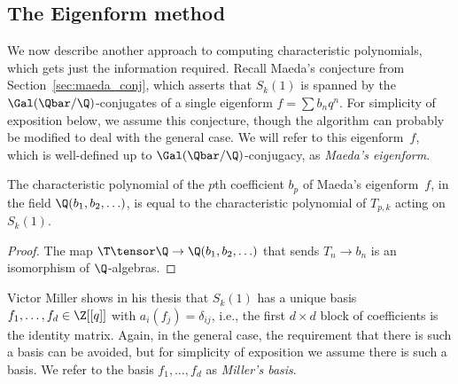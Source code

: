 \documentclass{report}
\begin{document}
\subsection{The Eigenform method}
We now describe another approach to computing characteristic
polynomials, which gets just the information required. Recall
Maeda's conjecture from Section~\ref{sec:maeda_conj}, which
asserts that $S_k(1)$ is spanned by the
$\Gal(\Qbar/\Q)$-conjugates of a single eigenform $f=\sum b_n
q^n$.  For simplicity of exposition below, we assume this
conjecture, though the algorithm can probably be modified to deal
with the general case.  We will refer to this eigenform~$f$, which
is well-defined up to $\Gal(\Qbar/\Q)$-conjugacy, as {\em Maeda's
eigenform}.

\begin{lemma} The characteristic polynomial of the $p$th coefficient $b_p$ of Maeda's
eigenform~$f$, in the field $\Q(b_1,b_2,\ldots)$, is equal to the characteristic
polynomial of $T_{p,k}$ acting on $S_k(1)$.
\end{lemma}
\begin{proof}
The map $\T\tensor\Q\to\Q(b_1,b_2,\ldots)$ that sends $T_n\to b_n$
is an isomorphism of $\Q$-algebras.
\end{proof}

Victor Miller shows in his thesis that $S_k(1)$ has a unique basis
$f_1, \ldots, f_d\in \Z[[q]]$ with $a_i(f_j)=\delta_{ij}$, i.e.,
the first $d\times d$ block of coefficients is the identity
matrix. Again, in the general case, the requirement that there is
such a basis can be avoided, but for simplicity of exposition we
assume there is such a basis. We refer to the basis $f_1, \ldots,
f_d$ as {\em Miller's basis}.
\end{document}
